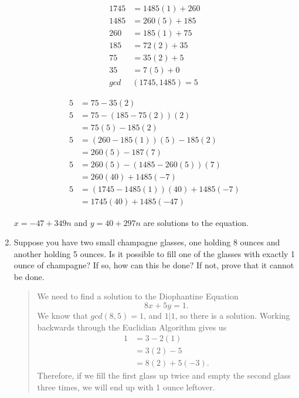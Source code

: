 \documentclass{hw}
\begin{document}
\begin{enumerate}
\begin{center}
\begin{minipage}[t]{0.4\textwidth}
\begin{align*}
1745 &= 1485(1) + 260\\
1485 &= 260(5) + 185\\
260 &= 185(1) + 75\\
185 &= 72(2) + 35\\
75 &= 35(2) + 5\\
35 &= 7(5) + 0\\
gcd&(1745,1485) = 5
\end{align*}
\end{minipage}
\begin{minipage}[t]{0.4\textwidth}
\begin{align*}
5 &= 75 - 35(2)\\
5 &= 75 - (185 - 75(2))(2)\\
&= 75(5) - 185(2)\\
5 &= (260-185(1))(5)-185(2)\\
&= 260(5)-187(7)\\
5 &= 260(5) - (1485 -260(5))(7)\\
&= 260(40) + 1485(-7)\\
5 &= (1745 - 1485(1))(40) + 1485(-7)\\
&= 1745(40) + 1485(-47)
\end{align*}
\end{minipage}
\end{center}

$x = -47 + 349n$ and $y = 40 + 297n$ are solutions to the equation.

\item Suppose you have two small champagne glasses, one holding 8 ounces and another holding 5 ounces. Is
it possible to fill one of the glasses with exactly 1 ounce of champagne? If so, how can this be done? If
not, prove that it cannot be done.
\begin{quote}
We need to find a solution to the Diophantine Equation
\[
8x+5y=1.
\]
We know that $gcd(8,5)=1$, and $1|1$, so there is a solution. Working backwards through the Euclidian
Algorithm gives us
\begin{align*}
1 &= 3-2(1)\\
&= 3(2)-5\\
&= 8(2)+5(-3).
\end{align*}
Therefore, if we fill the first glass up twice and empty the second glass three times, we will end up with
1 ounce leftover.
\end{quote}
\end{enumerate}
\end{document}
